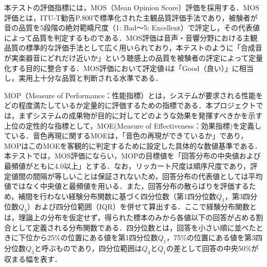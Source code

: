 本テストの評価指標には，MOS（Mean Opinion Score）評価を採用する．MOS評価とは，ITU-T勧告P.800で標準化された主観品質評価手法であり，被験者が音の品質を5段階の絶対範疇尺度（1: Bad〜5: Excellent）で評定し，その代表値によって品質を判定するものである．MOS評価は音声・音響分野における主観品質の標準的な評価手法として広く用いられており，本テストのように「合成音が実楽器音にどれだけ近いか」という聴感上の品質を被験者の評定によって定量化する目的に整合する．MOS評価において評定値4は「Good（良い）」に相当し，実用上十分な品質と判断される水準である\cite{itu_p800}．

MOP（Measure of Performance：性能指標）とは，システムが要求される性能をどの程度満たしているか定量的に評価するための指標である．本プロジェクトでは，まずシステムの成果物が目的に対してどのような効果を発揮すべきかを示す上位の定性的な指標として，MOE(Measure of Effectiveness：効果指標)を定義している．音色再現に関するMOEは，「音色の再現ができているか」であり，MOPはこのMOEを客観的に判定するために設定した具体的な数値基準である．本テストでは，MOS評価にならい，MOPの目標値を「回答分布の中央値および最頻値がともに4.0以上」とする．なお，リッカート尺度は順序尺度であり，評定値間の間隔が等しいことは保証されないため，回答分布の代表値としては平均値ではなく中央値と最頻値を用いる．また，回答分布の散らばりを評価するため，補間を行わない経験分布関数に基づく四分位数（第1四分位数$Q_1$，第3四分位数$Q_3$）および四分位範囲（IQR）を併せて算出する．ここで経験分布関数とは，理論上の分布を仮定せず，得られた標本のみから各値以下の回答が占める割合として定義される分布関数である．四分位数とは，回答を小さい順に並べたときに下位から25\%の位置にある値を第1四分位数$Q_1$，75\%の位置にある値を第3四分位数$Q_3$と呼ぶものであり，四分位範囲は$Q_3$と$Q_1$の差として回答の中央50\%が収まる幅を表す．

%

